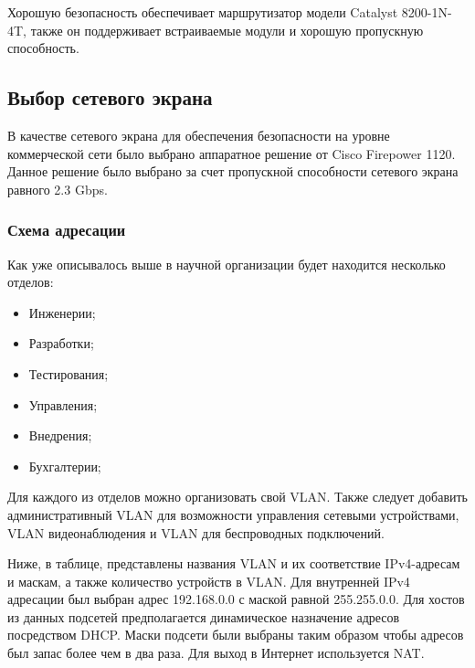 Хорошую безопасность обеспечивает маршрутизатор модели Catalyst 8200-1N-4T, также он поддерживает встраиваемые модули и хорошую пропускную способность.

\subsection{Выбор сетевого экрана}

В качестве сетевого экрана для обеспечения безопасности на уровне коммерческой сети было выбрано аппаратное решение от Cisco Firepower 1120.
Данное решение было выбрано за счет пропускной способности сетевого экрана равного 2.3 Gbps.

\subsubsection{Схема адресации}

Как уже описывалось выше в научной организации будет находится несколько отделов:

\begin{itemize}
    \item Инженерии;
    \item Разработки;
    \item Тестирования;
    \item Управления;
    \item Внедрения;
    \item Бухгалтерии;
\end{itemize}

Для каждого из отделов можно организовать свой VLAN. Также следует добавить административный VLAN для возможности управления сетевыми устройствами,
VLAN видеонаблюдения и VLAN для беспроводных подключений.

Ниже, в таблице, представлены названия VLAN и их соответствие IPv4-адресам и маскам, а также количество устройств в VLAN. Для внутренней IPv4 адресации 
был выбран адрес 192.168.0.0 с маской равной 255.255.0.0. Для хостов из данных подсетей предполагается динамическое назначение адресов посредством DHCP.
Маски подсети были выбраны таким образом чтобы адресов был запас более чем в два раза. Для выход в Интернет используется NAT.

